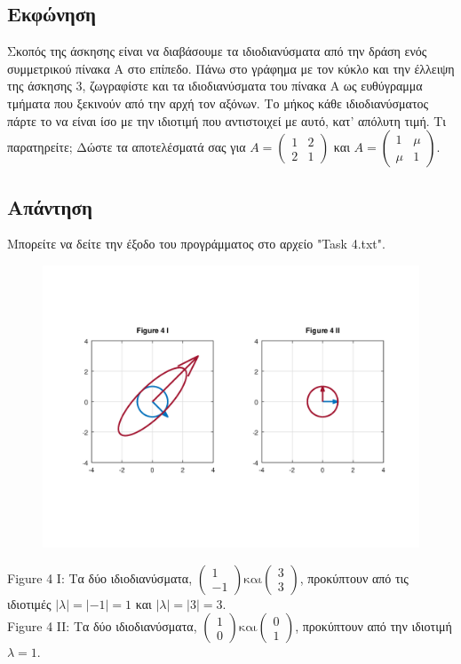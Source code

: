 \documentclass[a4paper,12pt]{article}
\begin{document}
\subsection{Εκφώνηση}
Σκοπός της άσκησης είναι να διαβάσουμε τα ιδιοδιανύσματα από την δράση ενός
συμμετρικού πίνακα Α στο επίπεδο. Πάνω στο γράφημα με τον κύκλο και την
έλλειψη της άσκησης 3, ζωγραφίστε και τα ιδιοδιανύσματα του πίνακα Α ως
ευθύγραμμα τμήματα που ξεκινούν από την αρχή τον αξόνων. Το μήκος κάθε
ιδιοδιανύσματος πάρτε το να είναι ίσο με την ιδιοτιμή που αντιστοιχεί με
αυτό, κατ' απόλυτη τιμή. Τι παρατηρείτε; Δώστε
τα αποτελέσματά σας για $
	A=\begin{pmatrix}
		1 & 2 \\
		2 & 1
	\end{pmatrix}
$ και $
	A=\begin{pmatrix}
		1   & \mu \\
		\mu & 1
	\end{pmatrix}
$.
\subsection{Απάντηση}
Μπορείτε να δείτε την έξοδο του προγράμματος στο αρχείο "Task 4.txt".
\begin{center}
	\begin{figure}[H]
		\centering
		\includegraphics[scale=0.8]{Task_4.png}
	\end{figure}
	Figure 4 I: Τα δύο ιδιοδιανύσματα, $
		\begin{pmatrix}
			1 \\
			-1
		\end{pmatrix} \text{και}
		\begin{pmatrix}
			3 \\
			3
		\end{pmatrix}
	$, προκύπτουν από τις ιδιοτιμές $|λ|=|-1|=1$ και $|λ|=|3|=3$.\\
	Figure 4 II: Τα δύο ιδιοδιανύσματα, $
		\begin{pmatrix}
			1 \\
			0
		\end{pmatrix} \text{και}
		\begin{pmatrix}
			0 \\
			1
		\end{pmatrix}
	$, προκύπτουν από την ιδιοτιμή $λ=1$.
\end{center}
\end{document}
